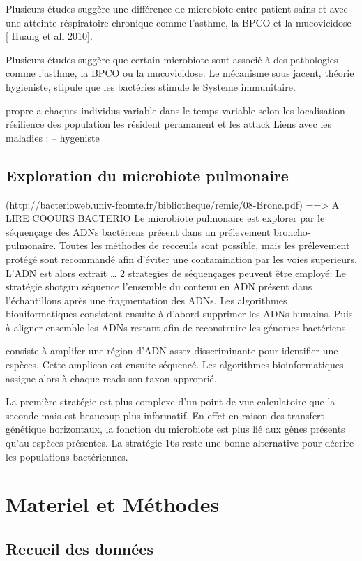 \documentclass[12pt,a4paper]{article}
\begin{document}
Plusieurs études suggère une différence de microbiote entre patient sains et avec une atteinte réspiratoire chronique comme l’asthme, la BPCO et la mucovicidose [ Huang et all 2010].

Plusieurs études suggère que certain microbiote sont associé à des pathologies comme l’asthme, la BPCO ou la mucovicidose. Le mécanisme sous jacent, théorie hygieniste, stipule que les bactéries stimule le Systeme immunitaire.

propre a chaques individus
variable dans le temps
variable selon les localisation
résilience des population
les résident peramanent et les attack
Liens avec les maladies :
– hygeniste

\subsection{Exploration du microbiote pulmonaire}

(http://bacterioweb.univ-fcomte.fr/bibliotheque/remic/08-Bronc.pdf) ==> A LIRE COOURS BACTERIO
Le microbiote pulmonaire est explorer par le séquençage des ADNs bactériens présent dans un prélevement broncho-pulmonaire. Toutes les méthodes de recceuils sont possible, mais les prélevement protégé sont recommandé afin d’éviter une contamination par les voies superieurs.
L’ADN est alors extrait …
2 strategies de séquençages peuvent être employé:
Le stratégie shotgun séquence l’ensemble du contenu en ADN présent dans l’échantillons après une fragmentation des ADNs. Les algorithmes bioniformatiques consistent ensuite à d’abord supprimer les ADNs humains. Puis à aligner ensemble les ADNs restant afin de reconstruire les génomes bactériens.

consiste à amplifer une région d’ADN assez disscriminante pour identifier une espèces. Cette amplicon est ensuite séquencé. Les algorithmes bioinformatiques assigne alors à chaque reads son taxon approprié.

La première stratégie est plus complexe d’un point de vue calculatoire que la seconde mais est beaucoup plus informatif. En effet en raison des transfert génétique horizontaux, la fonction du microbiote est plus lié aux gènes présents qu’au espèces présentes.
La stratégie 16s reste une bonne alternative pour décrire les populations bactériennes.

\section{Materiel et Méthodes}
\subsection{Recueil des données}
\end{document}
